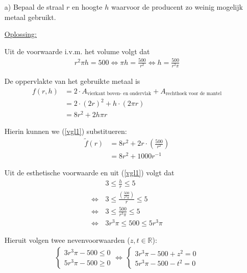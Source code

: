 \documentclass[kulak]{kulakarticle} %
\newcommand{\R}{\mathbb{R}} %
\begin{document}
\begin{enumerate}
	\item[a)] Bepaal de straal \(r\) en hoogte \(h\) waarvoor de producent zo weinig mogelijk metaal gebruikt.

	\underline{Oplossing:}

	Uit de voorwaarde i.v.m. het volume volgt dat
	\begin{align}
		r^2\pi h = 500 \Leftrightarrow \pi h = \frac{500}{r^2} \Leftrightarrow h = \frac{500}{r^2\pi} \label{vgl1}
	\end{align}

	De oppervlakte van het gebruikte metaal is
	\begin{align*}
		f(r,h) &= 2\cdot A_\text{vierkant boven- en ondervlak} + A_\text{rechthoek voor de mantel} \\
				&= 2\cdot (2r)^2 + h \cdot (2\pi r)\\
				&= 8r^2 + 2h\pi r
	\end{align*}

	Hierin kunnen we (\ref{vgl1}) substitueren:
	\begin{align*}
		\tilde{f}(r) &= 8r^2 + 2r \cdot \left(\frac{500}{r^2}\right)\\
					&= 8r^2 + 1000r^{-1}
	\end{align*}

	\newpage

	Uit de esthetische voorwaarde en uit (\ref{vgl1}) volgt dat
	\begin{align*}
		& 3 \leq \frac{h}{r} \leq 5 \\
		\Leftrightarrow\, & 3 \leq \frac{\left(\frac{500}{r^2\pi}\right)}{r} \leq 5 \\
		\Leftrightarrow\, & 3 \leq \frac{500}{r^3\pi} \leq 5 \\
		\Leftrightarrow\, & 3r^3\pi \leq 500 \leq 5r^3\pi
	\end{align*}

	Hieruit volgen twee nevenvoorwaarden (\(z,t \in \R\)):
	\begin{align*}
		\begin{cases}
			3r^3\pi - 500 \leq 0 \\
			5r^3\pi - 500 \geq 0
		\end{cases} \Longleftrightarrow \, \begin{cases}
		3r^3\pi - 500 + z^2 = 0 \\
		5r^3\pi - 500 - t^2 = 0
		\end{cases}
	\end{align*}


\end{enumerate}
\end{document}
